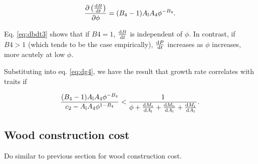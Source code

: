 \documentclass[a4paper,11pt]{article}
\begin{document}
\begin{appendices}
\begin{equation}\label{eq:dbdt3}
\frac{\partial \left( \frac{ {\rm d}B} {{\rm d}t}\right)}{\partial \phi}  =
(B_4-1) A_{\rm l} A_4\phi ^{-B_4}.
\end{equation}

Eq. \ref{eq:dbdt3} shows that if $B4=1$, $\frac{ {\rm d}B} {{\rm d}t}$ is independent
of $\phi$. In contrast, if $B4>1$ (which tends to be the case empirically), $\frac{ \textrm
{d}P} {{\rm d}t}$ increases as $\phi$ increases, more acutely at low $\phi$.

Substituting into eq. \ref{eq:dg4}, we have the result that growth rate correlates
with traits if

\begin{equation} \label{eq:G6}
\frac{(B_4-1) A_{\rm l} A_4\phi ^{-B_4}}{c_2 - A_{\rm l} A_4 \phi ^{1-B_4}}
< \frac{1}{\phi
 + \frac{{\rm d}M_\textrm{s}}{{\rm d}A_{\rm l}} + \frac{{\rm d}M_\textrm
 {b}}{{\rm d}A_{\rm l}} + \frac{{\rm d}M_{\rm r}}{{\rm d}A_{\rm l}}}.
\end{equation}

\subsection{Wood construction cost}

Do similar to previous section for wood construction cost.

\end{appendices}
\end{document}
